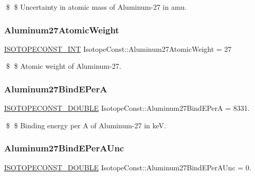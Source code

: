 \$ \$ Uncertainty in atomic mass of Aluminum-\/27 in amu. \mbox{\label{group___isotope_const-_aluminum-_al27_gaf1c6ac9d88bcbaca1fdd812d435c244d}} 
\subsubsection{\texorpdfstring{Aluminum27\+Atomic\+Weight}{Aluminum27AtomicWeight}}
{\footnotesize\ttfamily \mbox{\hyperlink{group___isotope_const-_macros_ga5f18360b3e99483a35c32d789e62621c}{I\+S\+O\+T\+O\+P\+E\+C\+O\+N\+S\+T\+\_\+\+I\+NT}} Isotope\+Const\+::\+Aluminum27\+Atomic\+Weight = 27}

\$ \$ Atomic weight of Aluminum-\/27. \mbox{\label{group___isotope_const-_aluminum-_al27_ga8e2358765ea3ec903fefbe3c5a71d95b}} 
\subsubsection{\texorpdfstring{Aluminum27\+Bind\+E\+PerA}{Aluminum27BindEPerA}}
{\footnotesize\ttfamily \mbox{\hyperlink{group___isotope_const-_macros_ga8f45a7272ce02c0b4c65c44636ed719a}{I\+S\+O\+T\+O\+P\+E\+C\+O\+N\+S\+T\+\_\+\+D\+O\+U\+B\+LE}} Isotope\+Const\+::\+Aluminum27\+Bind\+E\+PerA = 8331.}

\$ \$ Binding energy per A of Aluminum-\/27 in keV. \mbox{\label{group___isotope_const-_aluminum-_al27_gae7df84ac98e46592f021ec290ae6a9f6}} 
\subsubsection{\texorpdfstring{Aluminum27\+Bind\+E\+Per\+A\+Unc}{Aluminum27BindEPerAUnc}}
{\footnotesize\ttfamily \mbox{\hyperlink{group___isotope_const-_macros_ga8f45a7272ce02c0b4c65c44636ed719a}{I\+S\+O\+T\+O\+P\+E\+C\+O\+N\+S\+T\+\_\+\+D\+O\+U\+B\+LE}} Isotope\+Const\+::\+Aluminum27\+Bind\+E\+Per\+A\+Unc = 0.}

